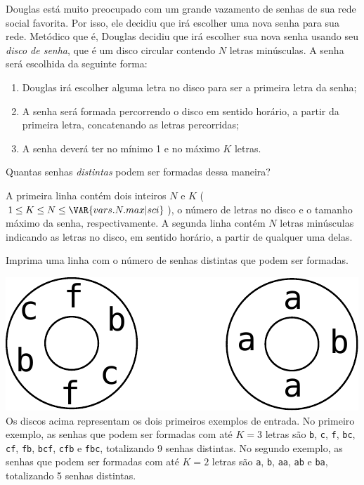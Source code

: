 Douglas está muito preocupado com um grande vazamento de senhas de sua rede
social favorita. Por isso, ele
decidiu que irá escolher uma nova senha para sua rede.
Metódico que é, Douglas decidiu que irá escolher sua nova senha usando seu
\textit{disco de senha}, que é um disco circular contendo $N$ letras minúsculas.
A senha será escolhida da seguinte forma:
\begin{enumerate}
    \item Douglas irá escolher alguma letra no disco para ser a primeira letra
    da senha;
    \item A senha será formada percorrendo o disco em sentido horário, a partir
    da primeira letra, concatenando as letras percorridas;
    \item A senha deverá ter no mínimo 1 e no máximo $K$ letras.
\end{enumerate}

Quantas senhas \textit{distintas} podem ser formadas dessa maneira?


A primeira linha contém dois inteiros $N$ e $K$ ($1 \leq K \leq N \leq
        \VAR{vars.N.max | sci}$), o número de letras no disco e o tamanho máximo
da senha, respectivamente.
A segunda linha contém $N$ letras minúsculas indicando as letras no disco, em
sentido horário, a partir de qualquer uma delas.

Imprima uma linha com o número de senhas distintas que podem ser formadas.

\includegraphics[scale=0.6]{disco0.pdf}\\
Os discos acima representam os dois primeiros exemplos de entrada.
No primeiro exemplo, as senhas que podem ser formadas com até $K=3$ letras são
\texttt{b}, \texttt{c}, \texttt{f}, \texttt{bc}, \texttt{cf}, \texttt{fb},
\texttt{bcf}, \texttt{cfb} e \texttt{fbc}, totalizando 9 senhas distintas.
No segundo exemplo, as senhas que podem ser formadas com até $K=2$ letras são
\texttt{a}, \texttt{b}, \texttt{aa}, \texttt{ab} e \texttt{ba}, totalizando 5 senhas distintas.

